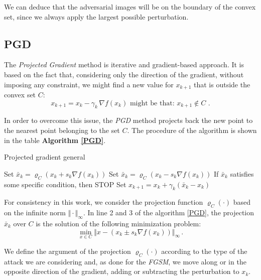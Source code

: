 \documentclass[10pt,twocolumn,letterpaper, english]{article}
\theoremstyle{definition}
\theoremstyle{plain}
\theoremstyle{plain}
\theoremstyle{plain}
\theoremstyle{plain}
\theoremstyle{remark}
\theoremstyle{remark}
\theoremstyle{definition}
\theoremstyle{definition}
\theoremstyle{definition}
\theoremstyle{definition}
\renewcommand{\rho}{\varrho}
\begin{document}
We can deduce that the adversarial images will be on the boundary of the convex set, since we always apply the largest possible perturbation. 

\subsection{PGD}

The \textit{Projected Gradient} method is iterative and gradient-based approach. 
It is based on the fact that, considering only the direction of the gradient, without imposing any constraint, we might find a new value for $x_{k+1}$ that is outside the convex set $C$: 
\begin{equation*}
    x_{k+1} = x_k - \gamma_k \, \nabla f(x_k) \text{   might be that: } x_{k+1} \notin C \,\,.
\end{equation*}

In order to overcome this issue, the \textit{PGD} method projects back the new point to the nearest point belonging to the set $C$. 
The procedure of the algorithm is shown in the table \textbf{Algorithm \ref{PGD}}. 

\begin{algorithm}
\caption{Projected gradient general}\label{PGD}
\begin{algorithmic}[1]
  \State Set $ \bar{x}_k = \rho_C(x_k + s_k \nabla f(x_k))$ 
  \State Set $ \bar{x}_k = \rho_C(x_k - s_k \nabla f(x_k))$ 
  \State If $\bar{x}_k$ satisfies some specific condition, then STOP
  \State Set $x_{k+1} = x_k + \gamma_k (\bar{x}_k - x_k)$ \Comment{with $\gamma_k \in (0, 1]$}
    
\EndFor
\end{algorithmic}
\end{algorithm}

For consistency in this work, we consider the projection function $\rho_C(\cdot)$ based on the infinite norm $\Vert \cdot \Vert_\infty$. 
In line 2 and 3 of the algorithm \ref{PGD}, the projection $\bar{x}_k$ over $C$ is the solution of the following minimization problem: 
\begin{equation*}
    \min_{x \in C} \Vert x - (x_k \pm s_k \nabla f(x_k)) \Vert_\infty \,. 
\end{equation*}

We define the argument of the projection $\rho_C(\cdot)$ according to the type of the attack we are considering and, as done for the \textit{FGSM}, we move along or in the opposite direction of the gradient, adding or subtracting the perturbation to $x_k$. \\
\end{document}
